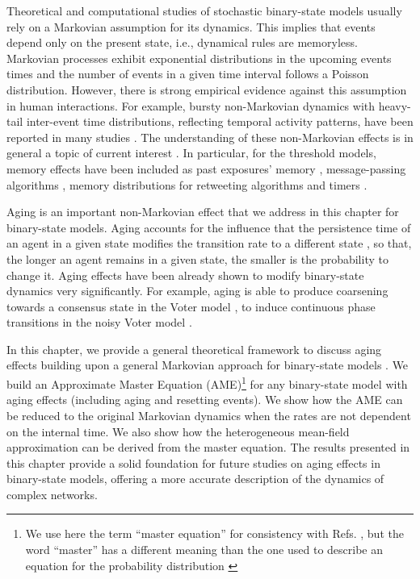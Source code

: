 Theoretical and computational studies of stochastic binary-state models usually rely on a Markovian assumption for its dynamics. This implies that events depend only on the present state, i.e., dynamical rules are memoryless. Markovian processes exhibit exponential distributions in the upcoming events times and the number of events in a given time interval follows a Poisson distribution. However, there is strong empirical evidence against this assumption in human interactions.  For example, bursty non-Markovian dynamics with heavy-tail inter-event time distributions, reflecting temporal activity patterns,  have been reported in many studies \cite{iribarren-2009,karsai-2011,rybski-2012,zignani-2016,artime-2017,kumar-2020}. The understanding of these non-Markovian effects is in general a topic of current interest \cite{van-mieghem-2013,starnini-2017,peralta-2020C,peralta-2020A}. In particular, for the threshold models, memory effects have been included as past exposures' memory \cite{dodds-2004}, message-passing algorithms \cite{shrestha-2014}, memory distributions for retweeting algorithms \cite{gleeson-2016} and timers \cite{oh-2018}.

Aging is an important non-Markovian effect that we address in this chapter for binary-state models. Aging accounts for the influence that the persistence time of an agent in a given state modifies the transition rate to a different state \cite{stark-2008,fernandez-gracia-2011,perez-2016,boguna-2014,chen-2020}, so that, the longer an agent remains in a given state, the smaller is the probability to change it. Aging effects have been already shown to modify binary-state dynamics very significantly. For example, aging is able to produce coarsening towards a consensus state in the Voter model \cite{fernandez-gracia-2011,peralta-2020C}, to induce continuous phase transitions in the noisy Voter model \cite{artime-2018,peralta-2020A}.

In this chapter, we provide a general theoretical framework to discuss aging effects building upon a general Markovian approach for binary-state models \cite{gleeson-2011,gleeson-2013}. We build an Approximate Master Equation (AME)\footnote{We use here the term  ``master equation'' for consistency with  Refs. \cite{gleeson-2011,gleeson-2013}, but the word ``master'' has a different meaning than the one used to describe an equation for the probability distribution \cite{peralta-2020B}} for any binary-state model with aging effects (including aging and resetting events). We show how the AME can be reduced to the original Markovian dynamics when the rates are not dependent on the internal time. We also show how the heterogeneous mean-field approximation can be derived from the master equation. The results presented in this chapter provide a solid foundation for future studies on aging effects in binary-state models, offering a more accurate description of the dynamics of complex networks. 

